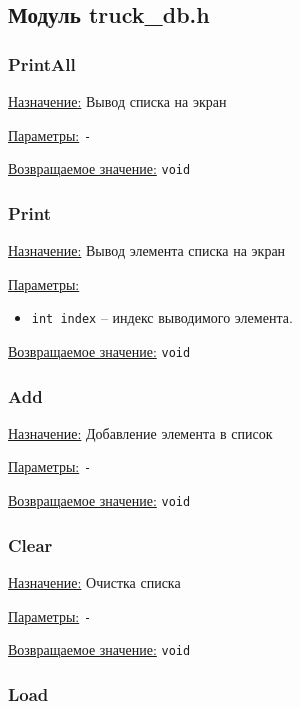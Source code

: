 \subsection*{Модуль truck\_db.h}


\subsubsection*{PrintAll}

\underline{Назначение:} Вывод списка на экран

\underline{Параметры:} \verb|-|

\underline{Возвращаемое значение:} \verb|void|


\subsubsection*{Print}

\underline{Назначение:} Вывод элемента списка на экран

\underline{Параметры:} 

\begin{itemize}
    \item \verb|int index| -- индекс выводимого элемента.
\end{itemize}

\underline{Возвращаемое значение:} \verb|void|


\subsubsection*{Add}

\underline{Назначение:} Добавление элемента в список

\underline{Параметры:} \verb|-|

\underline{Возвращаемое значение:} \verb|void|


\subsubsection*{Clear}

\underline{Назначение:} Очистка списка

\underline{Параметры:} \verb|-|

\underline{Возвращаемое значение:} \verb|void|


\subsubsection*{Load}

